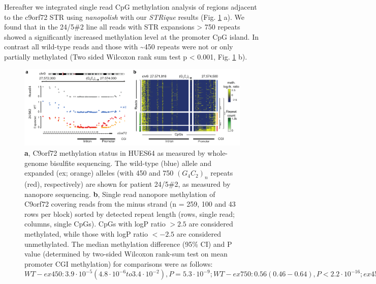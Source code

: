 Hereafter we integrated single read CpG methylation analysis of regions adjacent to the c9orf72 STR using \textit{nanopolish} \cite{Simpson2017} with our \textit{STRique} results (Fig. \ref{fig:strique:methylation_c9orf72_region} a). We found that in the 24/5\#2 line all reads with STR expansions > 750 repeats showed a significantly increased methylation level at the promoter CpG island. In contrast all wild-type reads and those with \textasciitilde450 repeats were not or only partially methylated (Two sided Wilcoxon rank sum test p < 0.001, Fig. \ref{fig:strique:methylation_c9orf72_region} b).

\begin{figure}[h]
    \centering
    \includegraphics[width=1.0\textwidth]{figures/strique/methylation_c9orf72_region.pdf}
    \captionsetup{format=plain}
    \caption[Methylation state analyses at the single-read level]{\textbf{a}, C9orf72 methylation status in HUES64 as measured by whole-genome bisulfite sequencing. The wild-type (blue) allele and expanded (ex; orange) alleles (with 450 and 750 $ (G_{4}C_{2})_{n} $ repeats (red), respectively) are shown for patient 24/5\#2, as measured by nanopore sequencing. \textbf{b}, Single read nanopore methylation of C9orf72 covering reads from the minus strand (n = 259, 100 and 43 rows per block) sorted by detected repeat length (rows, single read; columns, single CpGs). CpGs with logP ratio $> 2.5$ are considered methylated, while those with logP ratio $< -2.5$ are considered unmethylated. The median methylation difference (95\% CI) and P value (determined by two-sided Wilcoxon rank-sum test on mean promoter CGI methylation) for comparisons were as follows: $ WT-ex450: 3.9 \cdot 10^{-5} (4.8 \cdot 10^{-6} to 3.4 \cdot 10^{-2}), P = 5.3 \cdot 10^{-9}; WT-ex750: 0.56 (0.46-0.64), P < 2.2 \cdot 10^{-16}; ex450-ex750: 0.53 (0.40-0.64), P < 2.2 \cdot 10^{-16}; ***P < 0.001. $ }
    \label{fig:strique:methylation_c9orf72_region}
\end{figure}

